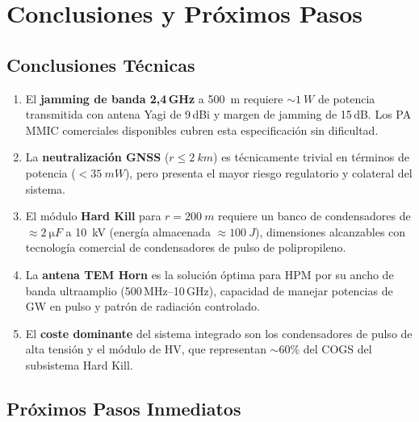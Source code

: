 \documentclass[12pt,a4paper]{article}
\begin{document}
\newpage

\section*{Conclusiones y Próximos Pasos}

\subsection*{Conclusiones Técnicas}

\begin{enumerate}[itemsep=4pt]
  \item El \textbf{jamming de banda 2,4\,GHz} a \SI{500}{m} requiere
        $\sim\SI{1}{W}$ de potencia transmitida con antena Yagi de 9\,dBi
        y margen de jamming de 15\,dB. Los PA MMIC comerciales disponibles
        cubren esta especificación sin dificultad.

  \item La \textbf{neutralización GNSS} ($r \leq \SI{2}{km}$) es técnicamente
        trivial en términos de potencia ($< \SI{35}{mW}$), pero presenta el
        mayor riesgo regulatorio y colateral del sistema.

  \item El módulo \textbf{Hard Kill} para $r = \SI{200}{m}$ requiere un banco
        de condensadores de $\approx \SI{2}{\micro F}$ a \SI{10}{kV}
        (energía almacenada $\approx \SI{100}{J}$), dimensiones alcanzables
        con tecnología comercial de condensadores de pulso de polipropileno.

  \item La \textbf{antena TEM Horn} es la solución óptima para HPM por su
        ancho de banda ultraamplio (500\,MHz–10\,GHz), capacidad de
        manejar potencias de GW en pulso y patrón de radiación controlado.

  \item El \textbf{coste dominante} del sistema integrado son los
        condensadores de pulso de alta tensión y el módulo de HV, que
        representan $\sim 60\%$ del COGS del subsistema Hard Kill.
\end{enumerate}

\subsection*{Próximos Pasos Inmediatos}
\end{document}
